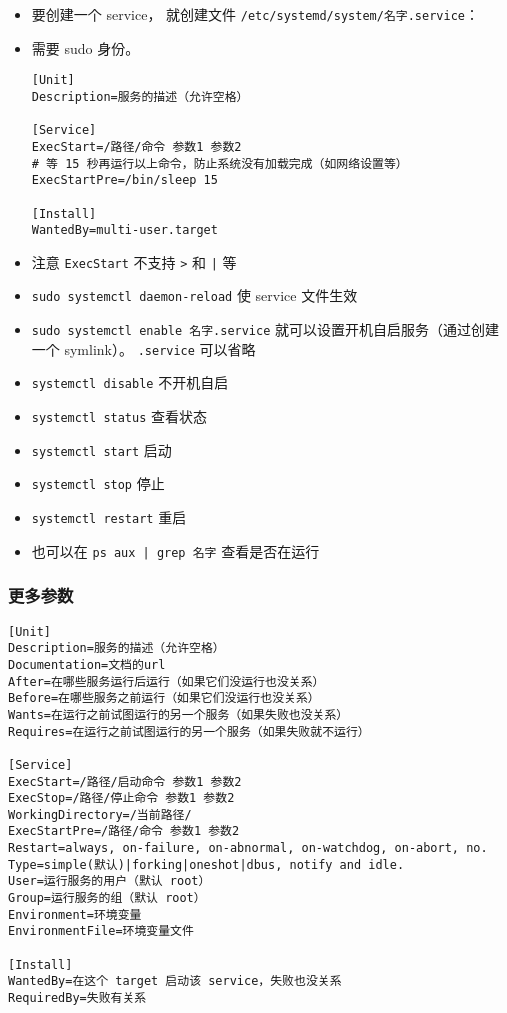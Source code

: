 
\begin{itemize}
\item 要创建一个 service， 就创建文件 \verb|/etc/systemd/system/名字.service|：
\item 需要 sudo 身份。
\begin{lstlisting}[language=none,caption=名字.service]
[Unit]
Description=服务的描述（允许空格）

[Service]
ExecStart=/路径/命令 参数1 参数2
# 等 15 秒再运行以上命令，防止系统没有加载完成（如网络设置等）
ExecStartPre=/bin/sleep 15

[Install]
WantedBy=multi-user.target
\end{lstlisting}
\item 注意 \verb|ExecStart| 不支持 \verb|>| 和 \verb`|` 等
\item \verb|sudo systemctl daemon-reload| 使 service 文件生效
\item \verb|sudo systemctl enable 名字.service| 就可以设置开机自启服务（通过创建一个 symlink）。 \verb`.service` 可以省略
\item \verb|systemctl disable| 不开机自启
\item \verb|systemctl status| 查看状态
\item \verb|systemctl start| 启动
\item \verb|systemctl stop| 停止
\item \verb|systemctl restart| 重启
\item 也可以在 \verb`ps aux | grep 名字` 查看是否在运行
\end{itemize}

\subsubsection{更多参数}
\begin{lstlisting}[language=none,caption=名字.service]
[Unit]
Description=服务的描述（允许空格）
Documentation=文档的url
After=在哪些服务运行后运行（如果它们没运行也没关系）
Before=在哪些服务之前运行（如果它们没运行也没关系）
Wants=在运行之前试图运行的另一个服务（如果失败也没关系）
Requires=在运行之前试图运行的另一个服务（如果失败就不运行）

[Service]
ExecStart=/路径/启动命令 参数1 参数2
ExecStop=/路径/停止命令 参数1 参数2
WorkingDirectory=/当前路径/
ExecStartPre=/路径/命令 参数1 参数2
Restart=always, on-failure, on-abnormal, on-watchdog, on-abort, no.
Type=simple(默认)|forking|oneshot|dbus, notify and idle.
User=运行服务的用户（默认 root）
Group=运行服务的组（默认 root）
Environment=环境变量
EnvironmentFile=环境变量文件

[Install]
WantedBy=在这个 target 启动该 service，失败也没关系
RequiredBy=失败有关系
\end{lstlisting}

